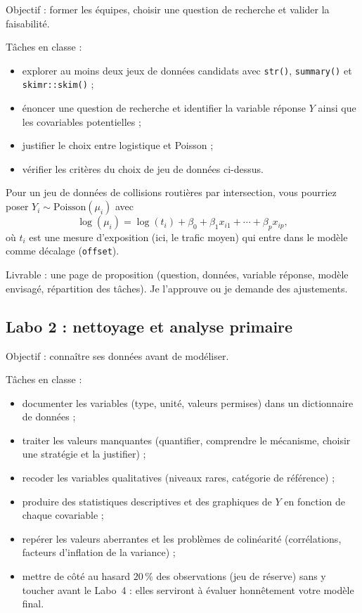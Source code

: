 \documentclass[11pt,letterpaper]{scrartcl}
\begin{document}
Objectif : former les équipes, choisir une question de recherche et valider la faisabilité.

Tâches en classe :
\begin{itemize}
  \item explorer au moins deux jeux de données candidats avec \texttt{str()}, \texttt{summary()} et \texttt{skimr::skim()} ;
  \item énoncer une question de recherche et identifier la variable réponse $Y$ ainsi que les covariables potentielles ;
  \item justifier le choix entre logistique et Poisson ;
  \item vérifier les critères du choix de jeu de données ci-dessus.
\end{itemize}

\begin{envexemple}
Pour un jeu de données de collisions routières par intersection, vous pourriez poser $Y_i \sim \text{Poisson}(\mu_i)$ avec
\[
  \log(\mu_i) = \log(t_i) + \beta_0 + \beta_1 x_{i1} + \cdots + \beta_p x_{ip},
\]
où $t_i$ est une mesure d'exposition (ici, le trafic moyen) qui entre dans le modèle comme décalage (\texttt{offset}).
\end{envexemple}

Livrable : une page de proposition (question, données, variable réponse, modèle envisagé, répartition des tâches). Je l'approuve ou je demande des ajustements.

\subsection{Labo 2 : nettoyage et analyse primaire}

Objectif : connaître ses données avant de modéliser.

Tâches en classe :
\begin{itemize}
  \item documenter les variables (type, unité, valeurs permises) dans un dictionnaire de données ;
  \item traiter les valeurs manquantes (quantifier, comprendre le mécanisme, choisir une stratégie et la justifier) ;
  \item recoder les variables qualitatives (niveaux rares, catégorie de référence) ;
  \item produire des statistiques descriptives et des graphiques de $Y$ en fonction de chaque covariable ;
  \item repérer les valeurs aberrantes et les problèmes de colinéarité (corrélations, facteurs d'inflation de la variance) ;
  \item mettre de côté au hasard $20\,\%$ des observations (jeu de réserve) sans y toucher avant le Labo~4 : elles serviront à évaluer honnêtement votre modèle final.
\end{itemize}
\end{document}
